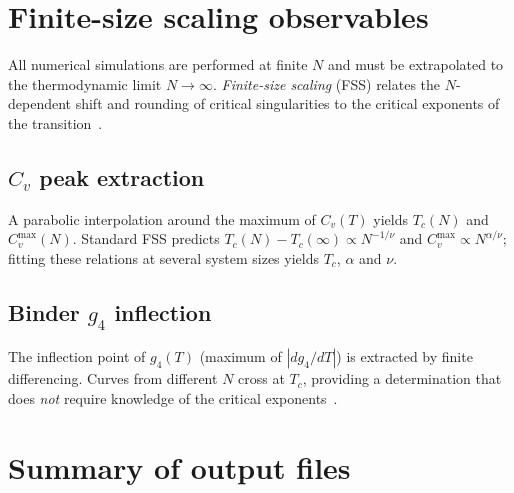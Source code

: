 \documentclass[11pt,a4paper]{article}
\begin{document}
\section{Finite-size scaling observables}\label{sec:fss}

All numerical simulations are performed at finite $N$ and
must be extrapolated to the thermodynamic limit
$N\to\infty$.  \emph{Finite-size scaling} (FSS) relates the
$N$-dependent shift and rounding of critical singularities
to the critical exponents of the
transition~\cite{Binder1986,Fisher1972}.

\subsection{$C_v$ peak extraction}
A parabolic interpolation around the maximum of $C_v(T)$ yields
$T_c(N)$ and $C_v^{\max}(N)$.  Standard FSS predicts
$T_c(N) - T_c(\infty) \propto N^{-1/\nu}$ and
$C_v^{\max} \propto N^{\alpha/\nu}$;
fitting these relations at several system sizes yields
$T_c$, $\alpha$ and $\nu$.

\subsection{Binder $g_4$ inflection}
The inflection point of $g_4(T)$ (maximum of $|dg_4/dT|$) is
extracted by finite differencing.  Curves from different $N$
cross at $T_c$, providing a determination that does \emph{not}
require knowledge of the critical
exponents~\cite{Binder1981,Binder1986}.

\section{Summary of output files}
\end{document}
